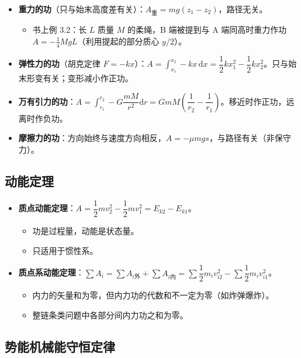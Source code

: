 \documentclass[12pt,a4paper]{ctexart}
\begin{document}
\begin{itemize}
    \item \textbf{重力的功}（只与始末高度差有关）：$A_{\text{重}} = mg(z_1 - z_2)$，路径无关。
    \begin{itemize}
        \item 书上例 3.2：长 $L$ 质量 $M$ 的柔绳，B 端被提到与 A 端同高时重力作功 $A = -\frac{1}{4}MgL$（利用提起的部分质心 $y/2$）。
    \end{itemize}
    \item \textbf{弹性力的功}（胡克定律 $F = -kx$）：$A = \displaystyle\int_{x_1}^{x_2} -kx\,\mathrm{d}x = \dfrac{1}{2}kx_1^2 - \dfrac{1}{2}kx_2^2$。只与始末形变有关；变形减小作正功。
    \item \textbf{万有引力的功}：$A = \displaystyle\int_{r_1}^{r_2} -G\dfrac{mM}{r^2}\mathrm{d}r = GmM\left(\dfrac{1}{r_2} - \dfrac{1}{r_1}\right)$。移近时作正功，远离时作负功。
    \item \textbf{摩擦力的功}：方向始终与速度方向相反，$A = -\mu mgs$，与路径有关（非保守力）。
\end{itemize}

\subsection{动能定理}

\begin{itemize}
    \item \textbf{质点动能定理}：$A = \dfrac{1}{2}mv_2^2 - \dfrac{1}{2}mv_1^2 = E_{k2} - E_{k1}$。
    \begin{itemize}
        \item 功是过程量，动能是状态量。
        \item 只适用于惯性系。
    \end{itemize}
    \item \textbf{质点系动能定理}：$\displaystyle\sum A_i = \sum A_{i\text{外}} + \sum A_{i\text{内}} = \sum \dfrac{1}{2}m_iv_{i2}^2 - \sum \dfrac{1}{2}m_iv_{i1}^2$。
    \begin{itemize}
        \item 内力的矢量和为零，但内力功的代数和不一定为零（如炸弹爆炸）。
        \item 整链条类问题中各部分间内力功之和为零。
    \end{itemize}
\end{itemize}

\subsection{势能\quad 机械能守恒定律}
\end{document}
